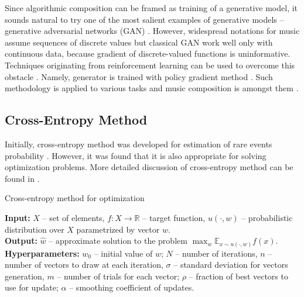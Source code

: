 \documentclass{article}
\begin{document}
Since algorithmic composition can be framed as training of a generative model, it sounds natural to try one of the most salient examples of generative models -- generative adversarial networks (GAN) \cite{goodfellow2014gan}. However, widespread notations for music assume sequences of discrete values but classical GAN work well only with continuous data, because gradient of discrete-valued functions is uninformative. Techniques originating from reinforcement learning can be used to overcome this obstacle \cite{yu2016seqgan,hjelm2017boundary}. Namely, generator is trained with policy gradient method \cite{williams1992simple}. Such methodology is applied to various tasks and music composition is amongst them \cite{limaguimaraes2017objective}.

\subsection{Cross-Entropy Method}
\label{subsec:crossentropy}

Initially, cross-entropy method was developed for estimation of rare events probability \cite{rubinstein1997optimization}. However, it was found that it is also appropriate for solving optimization problems. More detailed discussion of cross-entropy method can be found in \cite{boer2005tutorial}.

\begin{algorithm}
	\caption{Cross-entropy method for optimization} \label{alg:crossentropy}
	\textbf{Input:} $X$ -- set of elements, $f: X \to \mathbb{R}$ -- target function, $u(\cdot, w)$ -- probabilistic distribution over $X$ parametrized by vector $w$. \\
	\textbf{Output:} $\hat{w}$ -- approximate solution to the problem $\max_w \mathbb{E}_{x \sim u(\cdot, w)} f(x)$. \\
	\textbf{Hyperparameters:} $w_0$ -- initial value of $w$; $N$ -- number of iterations, $n$ -- number of vectors to draw at each iteration, $\sigma$ -- standard deviation for vectors generation, $m$ -- number of trials for each vector; $\rho$ -- fraction of best vectors to use for update; $\alpha$ -- smoothing coefficient of updates.
	\begin{algorithmic}[1]
		    \ENDFOR
		\ENDFOR
	\end{algorithmic}
\end{algorithm}
\end{document}

